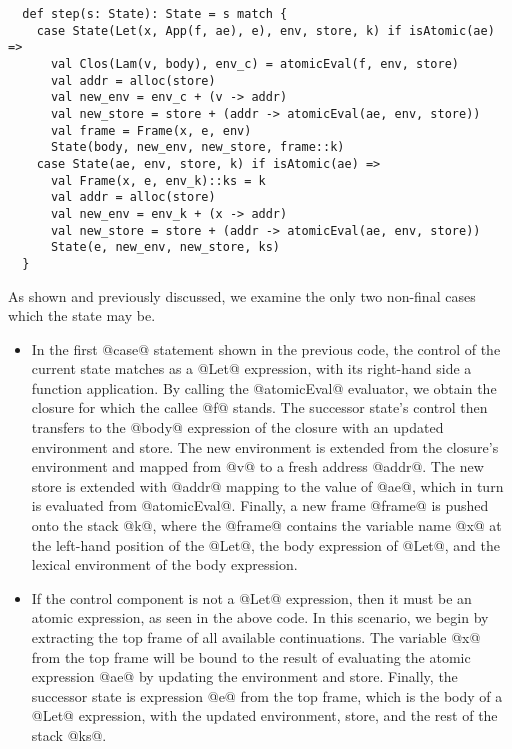 \documentclass[acmsmall, review]{acmart}\settopmatter{}
\begin{document}
\begin{lstlisting}
  def step(s: State): State = s match {
    case State(Let(x, App(f, ae), e), env, store, k) if isAtomic(ae) =>
      val Clos(Lam(v, body), env_c) = atomicEval(f, env, store)
      val addr = alloc(store)
      val new_env = env_c + (v -> addr)
      val new_store = store + (addr -> atomicEval(ae, env, store))
      val frame = Frame(x, e, env)
      State(body, new_env, new_store, frame::k)
    case State(ae, env, store, k) if isAtomic(ae) =>
      val Frame(x, e, env_k)::ks = k
      val addr = alloc(store)
      val new_env = env_k + (x -> addr)
      val new_store = store + (addr -> atomicEval(ae, env, store))
      State(e, new_env, new_store, ks)
  }
\end{lstlisting}

As shown and previously discussed, we examine the only two non-final cases which the state
may be.

\begin{itemize}

\item In the first @case@ statement shown in the previous code, the control of the current 
  state matches as a @Let@ expression, with its right-hand side a function application.
  By calling the @atomicEval@ evaluator, we obtain the closure for which the callee @f@ stands.
  The successor state's control then transfers to the @body@ expression of the closure with 
  an updated environment and store. The new environment is extended from the closure's 
  environment and mapped from @v@ to a fresh address @addr@. The new store is extended with
  @addr@ mapping to the value of @ae@, which in turn is evaluated from @atomicEval@.
  Finally, a new frame @frame@ is pushed onto the stack @k@, where the @frame@ contains 
  the variable name @x@ at the left-hand position of the @Let@, the body expression of 
  @Let@, and the lexical environment of the body expression.

\item If the control component is not a @Let@ expression, then it must be an atomic
  expression, as seen in the above code. In this scenario, we begin by extracting the
  top frame of all available continuations. The variable @x@ from the top frame will
  be bound to the result of evaluating the atomic expression @ae@ by updating the
  environment and store.
  Finally, the successor state is expression @e@ from the top frame,
  which is the body of a @Let@ expression, with the updated environment, store, and
  the rest of the stack @ks@.

\end{itemize}
\end{document}
